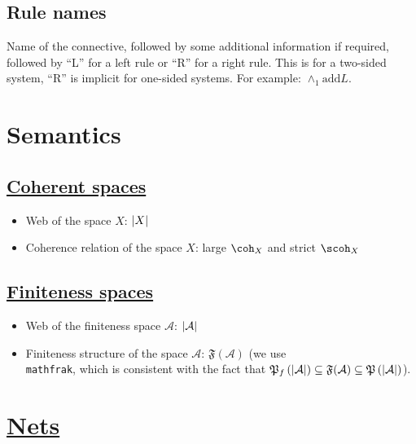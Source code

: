 \subsection{Rule names}\label{rule-names}

Name of the connective, followed by some additional information if
required, followed by ``L'' for a left rule or ``R'' for a right rule. This
is for a two-sided system, ``R'' is implicit for one-sided systems. For
example: $\wedge_1
\text{add} L$.

\section{Semantics}

\subsection{\texorpdfstring{\hyperref[coherent-semantics]{Coherent spaces}}{Coherent spaces}}\label{coherent-spaces}

\begin{itemize}
\item Web of the space $X$: $\left|X\right|$
\item Coherence relation of the space $X$: large $\coh_X$ and strict $\scoh_X$
\end{itemize}

\subsection{\texorpdfstring{\hyperref[finiteness-semantics]{Finiteness spaces}}{Finiteness spaces}}\label{finiteness-spaces}

\begin{itemize}
\item
  Web of the finiteness space
  $\mathcal
  A$:
  $\left|\mathcal
  A\right|$
\item
  Finiteness structure of the space
  $\mathcal
  A$:
  $\mathfrak
  F(\mathcal A)$ (we use
  \texttt{\\mathfrak},
  which is consistent with the fact that
  $\mathfrak{P}_f\left(\left|\mathcal
  A\right|\right)\subseteq \mathfrak
  F(\mathcal A)
  \subseteq\mathfrak{P}\left(\left|\mathcal
  A\right|\right)$).
\end{itemize}

\section{\texorpdfstring{\hyperref[nets]{Nets}}{Nets}}


